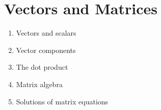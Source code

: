 
\chapter{Vectors and Matrices}

\begin{enumerate}
\item Vectors and scalars

\item Vector components

\item The dot product

\item Matrix algebra

\item Solutions of matrix equations
\end{enumerate}
